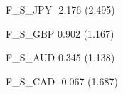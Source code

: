 F_S_JPY                                                                     -2.176                                                                                                                                                           
                                                                            (2.495)                                                                                                                                                          
                                                                                                                                                                                                                                             
F_S_GBP                                                                                              0.902                                                                                                                                   
                                                                                                    (1.167)                                                                                                                                  
                                                                                                                                                                                                                                             
F_S_AUD                                                                                                                      0.345                                                                                                           
                                                                                                                            (1.138)                                                                                                          
                                                                                                                                                                                                                                             
F_S_CAD                                                                                                                                               -0.067                                                                                 
                                                                                                                                                     (1.687)                                                                                 
                                                                                                                                                                                                                                             
